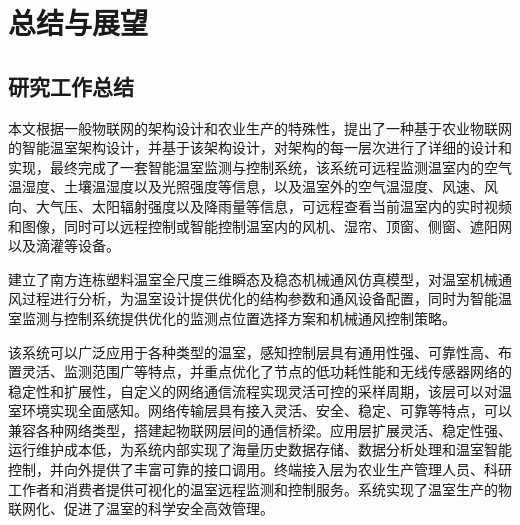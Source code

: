 
\chapter{总结与展望}
\label{chapter:Conclusion}

\section{研究工作总结}
本文根据一般物联网的架构设计和农业生产的特殊性，提出了一种基于农业物联网的智能温室架构设计，并基于该架构设计，对架构的每一层次进行了详细的设计和实现，最终完成了一套智能温室监测与控制系统，该系统可远程监测温室内的空气温湿度、土壤温湿度以及光照强度等信息，以及温室外的空气温湿度、风速、风向、大气压、太阳辐射强度以及降雨量等信息，可远程查看当前温室内的实时视频和图像，同时可以远程控制或智能控制温室内的风机、湿帘、顶窗、侧窗、遮阳网以及滴灌等设备。

建立了南方连栋塑料温室全尺度三维瞬态及稳态机械通风仿真模型，对温室机械通风过程进行分析，为温室设计提供优化的结构参数和通风设备配置，同时为智能温室监测与控制系统提供优化的监测点位置选择方案和机械通风控制策略。

该系统可以广泛应用于各种类型的温室，感知控制层具有通用性强、可靠性高、布置灵活、监测范围广等特点，并重点优化了节点的低功耗性能和无线传感器网络的稳定性和扩展性，自定义的网络通信流程实现灵活可控的采样周期，该层可以对温室环境实现全面感知。网络传输层具有接入灵活、安全、稳定、可靠等特点，可以兼容各种网络类型，搭建起物联网层间的通信桥梁。应用层扩展灵活、稳定性强、运行维护成本低，为系统内部实现了海量历史数据存储、数据分析处理和温室智能控制，并向外提供了丰富可靠的接口调用。终端接入层为农业生产管理人员、科研工作者和消费者提供可视化的温室远程监测和控制服务。系统实现了温室生产的物联网化、促进了温室的科学安全高效管理。

